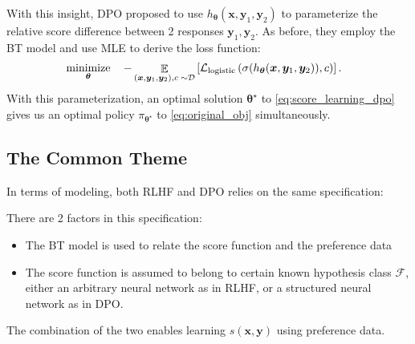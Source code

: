 \documentclass[11pt,a4paper]{article}
\begin{document}
With this insight, DPO proposed to use $h_{\boldsymbol \theta}(\bm{x}, \bm{y}_1, \bm{y}_2)$ to parameterize the relative score difference between 2 responses $\bm{y}_1, \bm{y}_2$. As before, they employ the BT model and use MLE to derive the loss function:
\begin{align}
\label{eq:score_learning_dpo}
& \operatorname*{\text{minimize}}_{\boldsymbol \theta} \quad -\mathop{\mathbb{E}}_{(\bm{x}, \bm{y}_1, \bm{y}_2), c \; \sim \mathcal{D}} \left[\mathcal{L}_{\rm logistic}\left(\sigma(h_{\boldsymbol \theta}(\bm{x}, \bm{y}_1, \bm{y}_2)), c\right)\right].
\end{align}
With this parameterization, an optimal solution $\boldsymbol \theta^{\star }$ to \eqref{eq:score_learning_dpo} gives us an optimal policy $\pi_{\boldsymbol \theta^{\star }}$ to \eqref{eq:original_obj} simultaneously.

\subsection{The Common Theme}%
\label{sub:the_common_theme}
In terms of modeling, both RLHF and DPO relies on the same specification:
\begin{tcolorbox}[center]
\end{tcolorbox}

There are 2 factors in this specification:
\begin{itemize}
    \item The BT model is used to relate the score function and the preference data
    \item The score function is assumed to belong to certain known hypothesis class $\mathcal{F}$, either an arbitrary neural network as in RLHF, or a structured neural network as in DPO.
\end{itemize}
The combination of the two enables learning $s(\bm{x}, \bm{y})$ using preference data.
\end{document}
